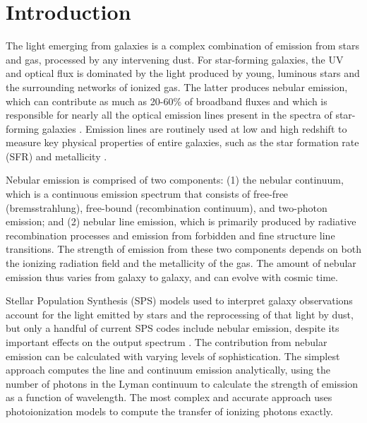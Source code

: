 \documentclass[linenumbers, tighten, trackchanges]{aastex61}%
\begin{document}
\section{Introduction} \label{sec:introduction}

The light emerging from galaxies is a complex combination of emission from stars and gas, processed by any intervening dust. For star-forming galaxies, the UV and optical flux is dominated by the light produced by young, luminous stars and the surrounding networks of ionized gas. The latter produces nebular emission, which can contribute as much as 20-60\% of  broadband fluxes and which is responsible for nearly all the optical emission lines present in the spectra of star-forming galaxies \citep{Anders03, Reines10}. Emission lines are routinely used at low and high redshift to measure key physical properties of entire galaxies, such as the star formation rate (SFR) and metallicity \citep[e.g.,][]{Tremonti04, Kewley08}.

Nebular emission is comprised of two components: (1) the nebular continuum, which is a continuous emission spectrum that consists of free-free (bremsstrahlung), free-bound (recombination continuum), and two-photon emission; and (2) nebular line emission, which is primarily produced by radiative recombination processes and emission from forbidden and fine structure line transitions. The strength of emission from these two components depends on both the ionizing radiation field and the metallicity of the gas. The amount of nebular emission thus varies from galaxy to galaxy, and can evolve with cosmic time.

Stellar Population Synthesis (SPS) models used to interpret galaxy observations account for the light emitted by stars and the reprocessing of that light by dust, but only a handful of current SPS codes include nebular emission, despite its important effects on the output spectrum \citep[see reviews in][]{Walcher11, Conroy13}. The contribution from nebular emission can be calculated with varying levels of sophistication. The simplest approach computes the line and continuum emission analytically, using the number of photons in the Lyman continuum to calculate the strength of emission as a function of wavelength. The most complex and accurate approach uses photoionization models to compute the transfer of ionizing photons exactly.
\end{document}
